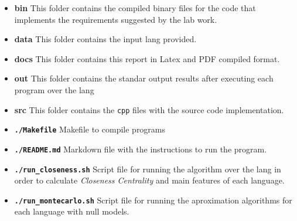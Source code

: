 \documentclass[12pt, a4paper]{article}
\begin{document}
\begin{itemize}
    \item \textbf{bin} This folder contains the compiled binary files for the code that implements the requirements suggested by the lab work.
    \item \textbf{data} This folder contains the input \acrshort{lang} provided.
    \item \textbf{docs} This folder contains this report in Latex and PDF compiled format.
    \item \textbf{out} This folder contains the standar output results after executing each program over the \acrshort{lang}
    \item \textbf{src} This folder contains the \texttt{cpp} files with the source code implementation.
    \item \textbf{\texttt{./Makefile}} Makefile to compile programs
    \item \textbf{\texttt{./README.md}} Markdown file with the instructions to run the program.
    \item \textbf{\texttt{./run_closeness.sh}} Script file for running the algorithm over the \acrshort{lang} in order to calculate \textit{Closeness Centrality} and 
    main features of each language.
    \item \textbf{\texttt{./run_montecarlo.sh}} Script file for running the aproximation algorithms for each language with null models.
\end{itemize}
\end{document}
